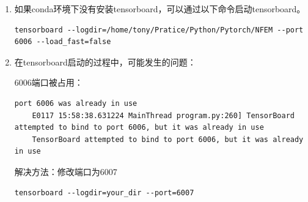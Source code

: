 \begin{enumerate}[label=\arabic*)]
    \item 如果conda环境下没有安装tensorboard，可以通过以下命令启动tensorboard。
    \begin{lstlisting}[style=demostyle,numbers=none] 
    tensorboard --logdir=/home/tony/Pratice/Python/Pytorch/NFEM --port 6006 --load_fast=false
    \end{lstlisting}

    \item 在tensorboard启动的过程中，可能发生的问题：

    6006端口被占用：
    \begin{lstlisting}[style=demostyle,numbers=none] 
    port 6006 was already in use 
    E0117 15:58:38.631224 MainThread program.py:260] TensorBoard attempted to bind to port 6006, but it was already in use
    TensorBoard attempted to bind to port 6006, but it was already in use
    \end{lstlisting}
    
    解决方法：修改端口为6007
    \begin{lstlisting}[style=demostyle,numbers=none] 
    tensorboard --logdir=your_dir --port=6007
    \end{lstlisting}
\end{enumerate}

